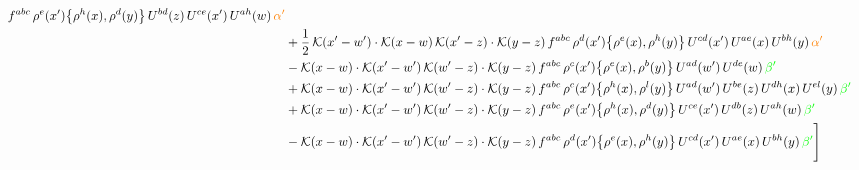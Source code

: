 \documentclass[9pt]{article}
\numberwithin{equation}{section}
\begin{document}
\begin{align}
f^{abc}\,\rho^{e}(x')\big\{\rho^{h}(x),\rho^{d}(y)\big\}\,U^{bd}(z)\,U^{ce}(x')\,U^{ah}(w)\,{\color{orange}\alpha'}\notag \\ & +\frac{1}{2}\,\mathcal{K}(x'-w')\cdot\mathcal{K}(x-w)\,\mathcal{K}(x'-z)\cdot\mathcal{K}(y-z)\, f^{abc}\,\rho^{d}(x')\big\{\rho^{e}(x),\rho^{h}(y)\big\}\,U^{cd}(x')\,U^{ae}(x)\,U^{bh}(y)\,{\color{orange}\alpha'}\notag \\ & -\mathcal{K}(x-w)\cdot\mathcal{K}(x'-w')\,\mathcal{K}(w'-z)\cdot\mathcal{K}(y-z)\, f^{abc}\,\rho^{c}(x')\big\{\rho^{e}(x),\rho^{b}(y)\big\}\,U^{ad}(w')\,U^{de}(w)\,{\color{green}\beta'}\notag \\ & +\mathcal{K}(x-w)\cdot\mathcal{K}(x'-w')\,\mathcal{K}(w'-z)\cdot\mathcal{K}(y-z)\, f^{abc}\,\rho^{c}(x')\big\{\rho^{h}(x),\rho^{l}(y)\big\}\,U^{ad}(w')\,U^{be}(z)\,U^{dh}(x)\,U^{el}(y)\,{\color{green}\beta'}\notag\\ &+\mathcal{K}(x-w)\cdot\mathcal{K}(x'-w')\,\mathcal{K}(w'-z)\cdot\mathcal{K}(y-z)\, f^{abc}\,\rho^{e}(x')\big\{\rho^{h}(x),\rho^{d}(y)\big\}\,U^{ce}(x')\,U^{db}(z)\,U^{ah}(w)\,{\color{green}\beta'}\notag \\ &-\mathcal{K}(x-w)\cdot\mathcal{K}(x'-w')\,\mathcal{K}(w'-z)\cdot\mathcal{K}(y-z)\, f^{abc}\,\rho^{d}(x')\big\{\rho^{e}(x),\rho^{h}(y)\big\}\,U^{cd}(x')\,U^{ae}(x)\,U^{bh}(y)\,{\color{green}\beta'}\Bigg]
\end{align}
\end{document}
